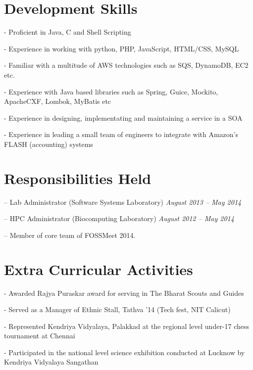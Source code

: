 \documentclass[margin,line]{resume}
\begin{document}
\begin{resume}
    \vspace{2mm}%
    
    \section{\mysidestyle Development Skills} 
    	\begin{list2}
	\item[-] Proficient in Java, C and Shell Scripting
	\item[-] Experience in working with python, PHP, JavaScript, HTML/CSS, MySQL
	\item[-] Familiar with a multitude of AWS technologies such as SQS, DynamoDB, EC2 etc.
	\item[-] Experience with Java based libraries such as Spring, Guice, Mockito, ApacheCXF, Lombok, MyBatis etc
	\item[-] Experience in designing, implementating and maintaining a service in a SOA
	\item[-] Experience in leading a small team of engineers to integrate with Amazon's FLASH (accounting) systems
	\end{list2}
	
    
    \section{\mysidestyle Responsibilities Held } 
	
	\begin{list2}
	\item[--] Lab Administrator (Software Systems Laboratory) \hfill \textit{August 2013 -- May 2014}
	\item[--] HPC Administrator (Biocomputing Laboratory)  \hfill  \textit{August 2012 -- May 2014}
	\item[--] Member of core team of FOSSMeet 2014.
	\end{list2}
	
    \section{\mysidestyle Extra Curricular Activities} 
    	\begin{list2}
	\item[-] Awarded Rajya Puraskar award for serving in The Bharat Scouts and Guides
	\item[-] Served as a Manager of Ethnic Stall, Tathva '14 (Tech fest, NIT Calicut)
	\item[-] Represented Kendriya Vidyalaya, Palakkad at the regional level under-17 chess tournament at Chennai
	\item[-] Participated in the national level science exhibition conducted at Lucknow by Kendriya
Vidyalaya Sangathan
	\end{list2}

\end{resume}
\end{document}
